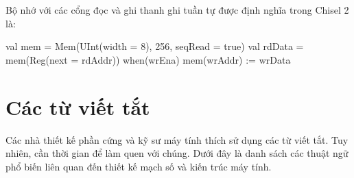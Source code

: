 \documentclass[%
    10pt,
    headinclude, footexclude,
    openright, %
    notitlepage,
    cleardoubleempty,
    headsepline,
    pointlessnumbers,
    bibtotoc, idxtotoc,
    ]{scrbook}
\begin{document}


Bộ nhớ với các cổng đọc và ghi thanh ghi tuần tự được định nghĩa trong Chisel 2 là: 

\begin{chisel}
  val mem = Mem(UInt(width = 8), 256, seqRead = true)
  val rdData = mem(Reg(next = rdAddr))
  when(wrEna) {
    mem(wrAddr) := wrData
  }
\end{chisel}

\chapter{Các từ viết tắt}

Các nhà thiết kế phần cứng và kỹ sư máy tính thích sử dụng các từ viết tắt. Tuy nhiên, cần thời gian để làm quen với chúng. Dưới đây là danh sách các thuật ngữ phổ biến liên quan đến thiết kế mạch số và kiến trúc máy tính. 
\end{document}
